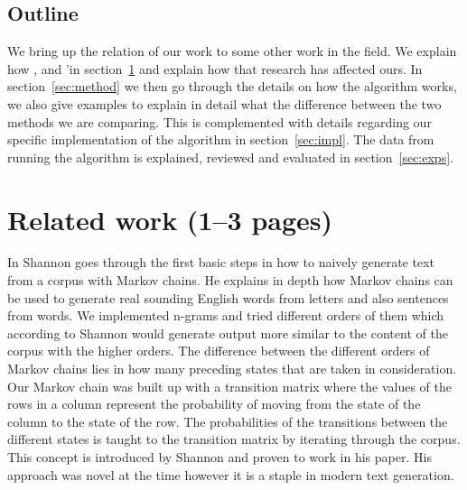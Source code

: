 \documentclass[a4paper,12pt]{article}
\begin{document}
\subsection{Outline}
We bring up the relation of our work to some other work in the field. We explain how \citep{shannon48}, \citep{Corpus} and \cite{McBarb}'in section~\ref{sec:relwork} and explain how that research has affected ours. 
In section~\ref{sec:method} we then go through the details on how the algorithm works, 
we also give examples to explain in detail what the difference between the two methods we are comparing. 
This is complemented with details regarding our specific implementation of the algorithm in section~\ref{sec:impl}. 
The data from running the algorithm is explained, reviewed and evaluated in section~\ref{sec:exps}.

\section{Related work (1--3 pages)}
\label{sec:relwork}
%

In \cite{shannon48} Shannon goes through the first basic steps in how to naively generate text from a corpus with Markov chains. 
He explains in depth how Markov chains can be used to generate real sounding English words from letters and also sentences from words. 
We implemented n-grams and tried different orders of them which according to Shannon would generate output more similar to the content of the corpus with the higher orders. 
The difference between the different orders of Markov chains lies in how many preceding states that are taken in consideration.
Our Markov chain was built up with a transition matrix where the values of the rows in a column represent the probability of moving from the state of the column to the state of the row. The probabilities of the transitions between the different states is taught to the transition matrix by iterating through the corpus. This concept is introduced by Shannon and proven to work in his paper.
His approach was novel at the time however it is a staple in modern text generation. 
\end{document}
